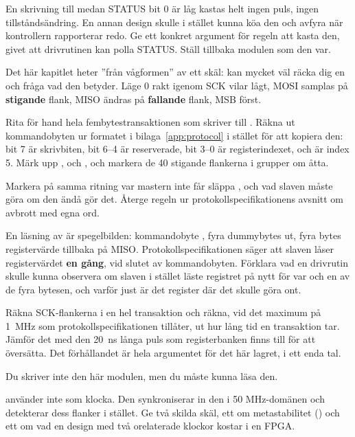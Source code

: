  En skrivning till  medan STATUS bit 0 är låg kastas helt \textemdash{} ingen
puls, ingen tillståndsändring. En annan design skulle i stället kunna köa den och avfyra när
kontrollern rapporterar redo. Ge ett konkret argument för regeln att kasta den, givet att drivrutinen
kan polla STATUS. Ställ tillbaka modulen som den var.

\label{c18:ex:waveform}
Det här kapitlet heter ”från vågformen” av ett skäl:  kan mycket väl räcka dig en och
fråga vad den betyder. Läge 0 rakt igenom \textemdash{} SCK vilar lågt, MOSI samplas på
\textbf{stigande} flank, MISO ändras på \textbf{fallande} flank, MSB först.

 Rita för hand hela fembytestransaktionen som skriver  till
. Räkna ut kommandobyten ur formatet i bilaga~\ref{app:protocol} i stället för att
kopiera den: bit 7 är skrivbiten, bit 6--4 är reserverade, bit 3--0 är registerindexet, och
 är index 5. Märk upp ,  och , och markera de 40 stigande
flankerna i grupper om åtta.

 Markera på samma ritning var mastern inte får släppa , och vad slaven måste göra
om den ändå gör det. Återge regeln ur protokollspecifikationens avsnitt om avbrott med egna ord.

 En läsning av  är spegelbilden: kommandobyte , fyra dummybytes ut,
fyra bytes registervärde tillbaka på MISO. Protokollspecifikationen säger att slaven låser
registervärdet \textbf{en gång}, vid slutet av kommandobyten. Förklara vad en drivrutin skulle kunna
observera om slaven i stället läste registret på nytt för var och en av de fyra bytesen, och varför
just  är det register där det skulle göra ont.

 Räkna SCK-flankerna i en hel transaktion och räkna, vid det maximum på 1~MHz som
protokollspecifikationen tillåter, ut hur lång tid en transaktion tar. Jämför det med den 20~ns långa
puls som registerbanken finns till för att översätta. Det förhållandet är hela argumentet för det här
lagret, i ett enda tal.

\label{c18:ex:slave}
Du skriver inte den här modulen, men du måste kunna läsa den.

  använder inte  som klocka. Den synkroniserar in den i
50 MHz-domänen och detekterar dess flanker i stället. Ge två skilda skäl, ett om metastabilitet
() och ett om vad en design med två orelaterade klockor kostar i en FPGA.

